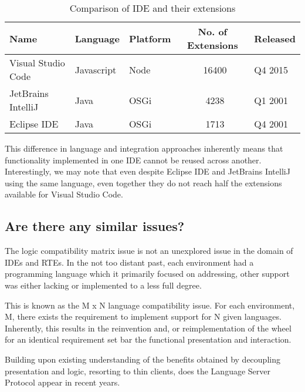 




\begin{table}[h!]
\centering
\begin{tabular}{|l|l|l|c|l|}
	\hline 
	\rule[-1ex]{0pt}{2.5ex} Name & Language & Platform & No. of Extensions & Released \\ 
	\hline 
	\hline 
	\rule[-1ex]{0pt}{2.5ex} Visual Studio Code & Javascript & Node & ~16400 & Q4 2015\\ 
	\hline 
	\rule[-1ex]{0pt}{2.5ex} JetBrains IntelliJ & Java & OSGi  & ~4238 & Q1 2001 \\ 
	\hline 
	\rule[-1ex]{0pt}{2.5ex} Eclipse IDE & Java & OSGi & ~1713 & Q4 2001 \\ 
	\hline 
\end{tabular} 
\caption{Comparison of IDE and their extensions}
\end{table}

This difference in language and integration approaches inherently means that functionality implemented in one IDE cannot be reused across another. Interestingly, we may note that even despite Eclipse IDE and JetBrains IntelliJ using the same language, even together they do not reach half the extensions available for Visual Studio Code.

\subsection{Are there any similar issues?}

The logic compatibility matrix issue is not an unexplored issue in the domain of IDEs and RTEs. In the not too distant past, each environment had a programming language which it primarily focused on addressing, other support was either lacking or implemented to a less full degree. 

This is known as the M x N language compatibility issue. For each environment, M, there exists the requirement to implement support for N given languages. Inherently, this results in the reinvention and, or reimplementation of the wheel for an identical requirement set bar the functional presentation and interaction.

Building upon existing understanding of the benefits obtained by decoupling presentation and logic, resorting to thin clients, does the Language Server Protocol \parencite{lspGitHubSiteMSFT} appear in recent years.

